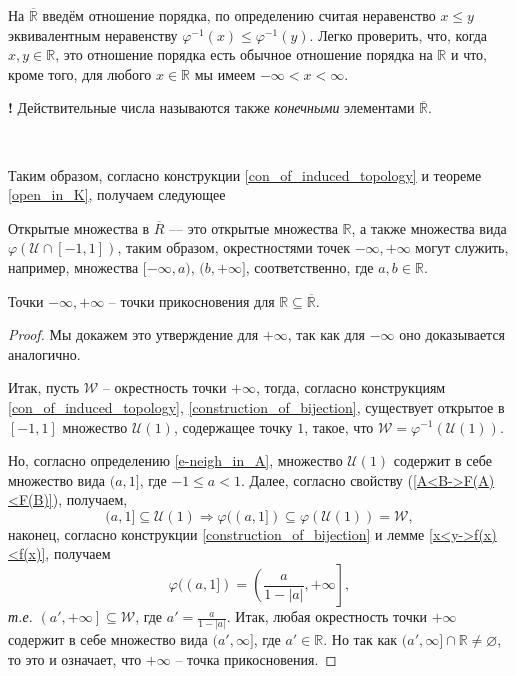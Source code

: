 \begin{construction}
 На $\overline{\mathbb{R}}$ введём отношение порядка, по определению считая неравенство $x \le y$ эквивалентным неравенству $\varphi^{-1}(x) \le \varphi^{-1}(y)$. Легко проверить, что, когда $x,y \in \mathbb{R}$, это отношение порядка есть обычное отношение порядка на $\mathbb{R}$ и что, кроме того, для любого $x\in \mathbb{R}$ мы имеем $- \infty < x < \infty.$    
\end{construction}

\begin{mydanger}{\bf !}
    Действительные числа называются также \textit{конечными} элементами $\overline{\mathbb{R}}.$ 
\end{mydanger}~

Таким образом, согласно конструкции \ref{con_of_induced_topology} и теореме \ref{open_in_K}, получаем следующее

\begin{definition}
 Открытые множества в $\overline{R}$ — это открытые множества $\mathbb{R}$, а также множества вида $\varphi(\mathscr{U}\cap [-1,1])$, таким образом, окрестностями точек $-\infty,+\infty$ могут служить, например, множества $[-\infty, a)$, $(b,+\infty]$, соответственно, где $a,b \in \mathbb{R}$.  
\end{definition}


\begin{lemma}\label{niegh_of_infty_on_R}
  Точки $-\infty, + \infty$ -- точки прикосновения для $\mathbb{R} \subseteq \overline{\mathbb{R}}.$
 \end{lemma}
 \begin{proof}
Мы докажем это утверждение для $+\infty$, так как для $-\infty$ оно доказывается аналогично.

Итак, пусть $\mathscr{W}$ -- окрестность точки $+\infty$, тогда, согласно конструкциям \ref{con_of_induced_topology}, \ref{construction_of_bijection}, существует открытое в $[-1,1]$ множество $\mathscr{U}(1)$, содержащее точку $1$, такое, что $\mathscr{W} = \varphi^{-1}(\mathscr{U}(1))$.  

Но, согласно определению \ref{e-neigh_in_A}, множество $\mathscr{U}(1)$ содержит в себе множество вида $(a,1]$, где $-1\le a <1$. Далее, согласно свойству (\ref{A<B->F(A)<F(B)}), получаем, 
\[
 (a,1] \subseteq \mathscr{U}(1) \Longrightarrow \varphi((a,1]) \subseteq \varphi(\mathscr{U}(1)) = \mathscr{W},
\]
наконец, согласно конструкции \ref{construction_of_bijection} и лемме \ref{x<y->f(x)<f(x)}, получаем
\[
 \varphi((a,1]) = \left.\left( \frac{a}{1-|a|}, +\infty\right.\right],
\]
\textit{т.е.} $\left.\left( a', +\infty\right.\right] \subseteq \mathscr{W}$, где $a' = \frac{a}{1-|a|}$. Итак, любая окрестность точки $+\infty$ содержит в себе множество вида $(a',\infty]$, где $a' \in \mathbb{R}$. Но так как $(a',\infty] \cap \mathbb{R} \ne \varnothing$, то это и означает, что $+\infty$ -- точка прикосновения. 
 \end{proof}

